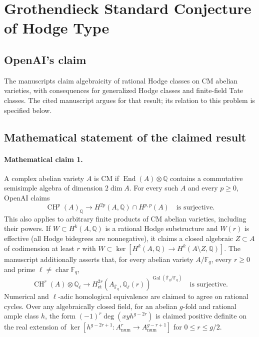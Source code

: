 \documentclass[11pt]{article}
\begin{document}
\section*{Grothendieck Standard Conjecture of Hodge Type}

\subsection{OpenAI's claim}
The manuscripts claim algebraicity of rational Hodge classes on CM abelian varieties, with consequences for generalized Hodge classes and finite-field Tate classes. The cited manuscript argues for that result; its relation to this problem is specified below.

\subsection{Mathematical statement of the claimed result}
\paragraph{Mathematical claim 1.} A complex abelian variety $A$ is CM if $\operatorname{End}(A)\otimes\mathbb Q$ contains a commutative semisimple algebra of dimension $2\dim A$. For every such $A$ and every $p\ge0$, OpenAI claims
\[
\operatorname{CH}^p(A)_{\mathbb Q}\longrightarrow H^{2p}(A,\mathbb Q)\cap H^{p,p}(A)
\quad\text{is surjective}.
\]
This also applies to arbitrary finite products of CM abelian varieties, including their powers. If $W\subset H^k(A,\mathbb Q)$ is a rational Hodge substructure and $W(r)$ is effective (all Hodge bidegrees are nonnegative), it claims a closed algebraic $Z\subset A$ of codimension at least $r$ with $W\subset\ker[H^k(A,\mathbb Q)\to H^k(A\setminus Z,\mathbb Q)]$.
The manuscript additionally asserts that, for every abelian variety $A/\mathbb F_q$, every $r\ge0$ and prime $\ell\ne\operatorname{char}\mathbb F_q$,
\[
\operatorname{CH}^r(A)\otimes\mathbb Q_\ell\longrightarrow
H^{2r}_{\mathrm{\acute et}}(A_{\overline{\mathbb F}_q},\mathbb Q_\ell(r))^{\operatorname{Gal}(\overline{\mathbb F}_q/\mathbb F_q)}
\quad\text{is surjective}.
\]
Numerical and $\ell$-adic homological equivalence are claimed to agree on rational cycles. Over any algebraically closed field, for an abelian $g$-fold and rational ample class $h$, the form $(-1)^r\deg(xyh^{g-2r})$ is claimed positive definite on the real extension of $\ker[h^{g-2r+1}:A^r_{\mathrm{num}}\to A^{g-r+1}_{\mathrm{num}}]$ for $0\le r\le g/2$.
\end{document}
